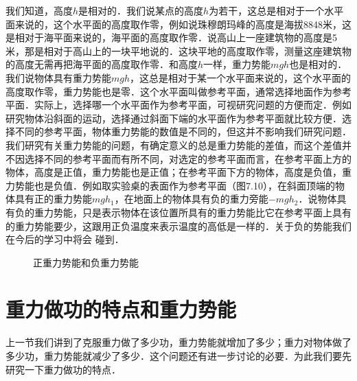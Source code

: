 我们知道，高度$h$是相对的．我们说某点的高度$h$为若干，这总是相对于一个水平面来说的，这个水平面的高度取作零，例如说珠穆朗玛峰的高度是海拔8848米，这是相对于海平面来说的，海平面的高度取作零．说高山上一座建筑物的高度是5米，那是相对于高山上的一块平地说的．这块平地的高度取作零，测量这座建筑物的高度无需再把海平面的高度取作零．和高度$h$一样，重力势能$mgh$也是相对的．我们说物体具有重力势能$mgh$，这总是相对于某一个水平面来说的，这个水平面的高度取作零，重力势能也是零．这个水平面叫做参考平面，通常选择地面作为参考平面．实际上，选择哪一个水平面作为参考平面，可视研究问题的方便而定．例如研究物体沿斜面的运动，选择通过斜面下端的水平面作为参考平面就比较方便．选择不同的参考平面，物体重力势能的数值是不同的，但这并不影响我们研究问题．我们研究有关重力势能的问题，有确定意义的总是重力势能的差值，而这个差值并不因选择不同的参考平面而有所不同，对选定的参考平面而言，在参考平面上方的物体，高度是正值，重力势能也是正值；在参考平面下方的物体，高度是负值，重力势能也是负值．例如取实验桌的表面作为参考平面（图7.10），在斜面顶端的物体具有正的重力势能$mgh_1$，在地面上的物体具有负的重力旁能$-mgh_2$．说物体具有负的重力势能，只是表示物体在该位置所具有的重力势能比它在参考平面上具有的重力势能要少，这跟用正负温度来表示温度的高低是一样的．关于负的势能我们在今后的学习中将会
碰到．
\begin{figure}[H]
    \centering
    \caption{正重力势能和负重力势能}
\end{figure}
\newpage
\section{重力做功的特点和重力势能}
上一节我们讲到了克服重力做了多少功，重力势能就增加了多少；重力对物体做了多少功，重力势能就减少了多少．这个问题还有进一步讨论的必要．为此我们要先研究一下重力做功的特点．

